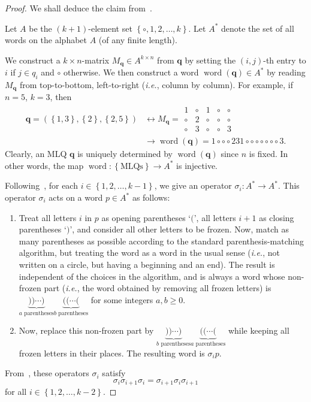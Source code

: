 \documentclass[reqno]{amsart}
\newcommand{\0}{\phantom{c}}
\newcommand{\qq}{\mathbf{q}}
\newcommand{\word}{\operatorname{word}}
\newcommand{\set}[1]{\left\{ #1 \right\}}
\newcommand{\tup}[1]{\left( #1 \right)}
\theoremstyle{plain}
\theoremstyle{definition}
\numberwithin{equation}{section}
\begin{document}
\begin{proof}
We shall deduce the claim from~\cite[Ch.~5, (5.6.3)]{Loth}.

Let $A$ be the $\tup{k+1}$-element set $\set{\circ, 1, 2, \ldots, k}$.
Let $A^*$ denote the set of all words on the alphabet $A$
(of any finite length).

We construct a $k \times n$-matrix $M_{\qq} \in A^{k \times n}$ from $\qq$ by setting the $\tup{i, j}$-th
entry to $i$ if $j \in q_i$ and $\circ$ otherwise.
We then construct a word $\word(\qq) \in A^*$ by reading $M_{\qq}$ from top-to-bottom, left-to-right (\textit{i.e.}, column by column).
For example, if $n = 5$, $k = 3$, then
\begin{align*}
\qq = \tup{\set{1, 3}, \set{2},
\set{2, 5}}
& \longleftrightarrow
 M_{\qq}
 =
 \begin{array}{ccccc}
  1 & \circ & 1 & \circ & \circ \\
  \circ & 2 & \circ  & \circ & \circ \\
  \circ & 3  & \circ & \circ & 3
 \end{array}
 \\ & \longrightarrow
 \word(\qq) = 1 \circ \circ \circ 2 3 1 \circ \circ \circ \circ \circ \circ \circ 3 .
\end{align*}
Clearly, an MLQ $\qq$ is uniquely determined by $\word(\qq)$ since $n$ is fixed.
In other words, the map $\word \colon \set{\text{MLQs}} \to A^*$
is injective.

Following~\cite[\S5.5]{Loth}, for each $i \in \set{1, 2, \ldots, k-1}$, we give an operator
$\sigma_i \colon A^* \to A^*$.
This operator $\sigma_i$ acts on a word $p \in A^*$ %
as follows:
\begin{enumerate}
 \item Treat all letters $i$ in $p$ as opening parentheses `$($',
       all letters $i+1$ as closing parentheses `$)$',
       and consider all other letters to be frozen.
       Now, match as many parentheses as possible
       according to the standard parenthesis-matching algorithm,
       but treating the word as a word in the usual sense
       (\textit{i.e.}, not written on a circle, but having a beginning
       and an end).
       The result is independent of the choices in the algorithm,
       and is always a word whose non-frozen
       part (\textit{i.e.}, the word obtained by removing
       all frozen letters) is
       $\underbrace{))\cdots)}_{a\text{ parentheses}}
       \underbrace{((\cdots(}_{b\text{ parentheses}}$
       for some integers $a, b \geq 0$.
 \item Now, replace this non-frozen part by
       $\underbrace{))\cdots)}_{b\text{ parentheses}}
       \underbrace{((\cdots(}_{a\text{ parentheses}}$
       while keeping all frozen letters in their places.
       The resulting word is $\sigma_i p$.
\end{enumerate}
From~\cite[Eq.~(5.6.3)]{Loth}, these operators
$\sigma_i$ satisfy
\begin{equation}
 \sigma_i \sigma_{i+1} \sigma_i
 = \sigma_{i+1} \sigma_i \sigma_{i+1}
 \label{pf.prop:braid.loth-eq}
\end{equation}
for all $i \in \set{1, 2, \ldots, k-2}$.


\end{proof}
\end{document}
